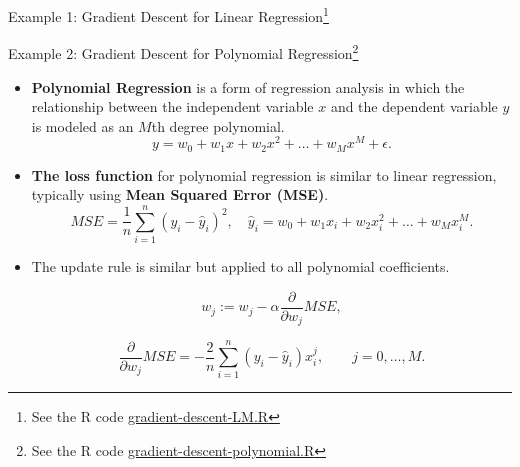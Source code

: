 \documentclass[10pt, hyperref={colorlinks = true,linkcolor = blue}]{beamer}
\begin{document}
{{\begin{frame}{Example 1: Gradient Descent for Linear Regression\footnote{See the R code \href{https://github.com/yadavrishikesh/Into-NNs/tree/main/code}{gradient-descent-LM.R}}}
\begin{itemize}
    \end{itemize}
    
\end{frame}

\begin{frame}{Example 2: Gradient Descent for Polynomial Regression\footnote{See the R code \href{https://github.com/yadavrishikesh/Into-NNs/tree/main/code}{gradient-descent-polynomial.R}}}
\begin{itemize}
\item \textbf{Polynomial Regression} is a form of regression analysis in which the relationship between the independent variable \(x\) and the dependent variable \(y\) is modeled as an \(M\)th degree polynomial.
\[
y = w_0 + w_1 x + w_2 x^2 + \ldots + w_M x^M + \epsilon.
\]
\item \textbf{The loss function} for polynomial regression is similar to linear regression, typically using \textbf{Mean Squared Error (MSE)}.
\[
MSE = \frac{1}{n} \sum_{i=1}^{n} (y_i - \hat{y}_i)^2, \quad 
\hat{y}_i = w_0 + w_1 x_i + w_2 x_i^2 + \ldots + w_M x_i^M.
\]
\item The update rule is similar but applied to all polynomial coefficients.

\[
w_j := w_j - \alpha \frac{\partial}{\partial w_j} MSE,
\]

\[
\frac{\partial}{\partial w_j} MSE = -\frac{2}{n} \sum_{i=1}^{n} (y_i - \hat{y}_i) x_i^j, \qquad j=0,\ldots,M.
\]
\end{itemize}
\end{frame}
}

}
\end{document}
